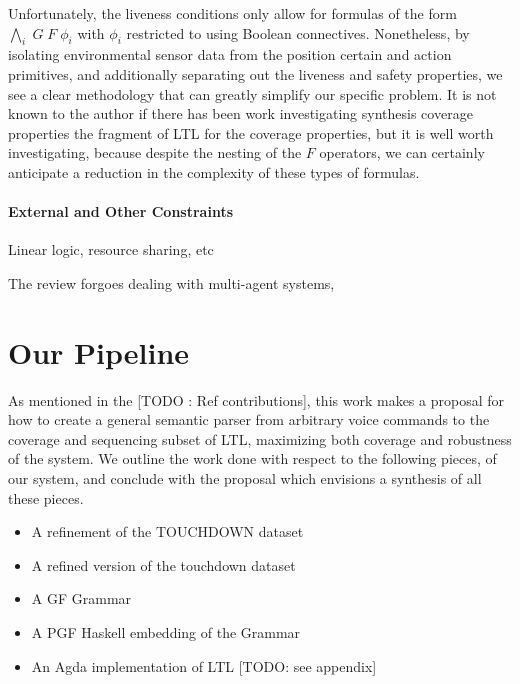 \documentclass{article}
\begin{document}
Unfortunately, the liveness conditions only allow for formulas of the form
$\underset{i}{\bigwedge}\;G\; F\; \phi_i$ with $\phi_i$ restricted to using
Boolean connectives. Nonetheless, by isolating environmental sensor data from
the position certain and action primitives, and additionally separating out the liveness
and safety properties, we see a clear methodology that can greatly simplify our
specific problem. It is not known to the author if there has been work
investigating synthesis coverage properties the fragment of LTL for the coverage
properties, but it is well worth investigating, because despite the nesting of
the $F$ operators, we can certainly anticipate a reduction in the complexity of
these types of formulas.



\paragraph{External and Other Constraints}

Linear logic, resource sharing, etc

The review \cite{synthGazit} forgoes dealing with multi-agent systems,

\section{Our Pipeline}

As mentioned in the [TODO : Ref contributions], this work makes a proposal for
how to create a general semantic parser from arbitrary voice commands to the
coverage and sequencing subset of LTL, maximizing both coverage and robustness
of the system. We outline the work done with respect to the following pieces, of
our system, and conclude with the proposal which envisions a synthesis of all
these pieces.

\begin{itemize}[noitemsep]
\item A refinement of the TOUCHDOWN dataset \cite{chen2019touchdown}
\item A refined version of the touchdown dataset
\item A GF Grammar
\item A PGF Haskell embedding of the Grammar
\item An Agda implementation of LTL [TODO: see appendix]
\end{itemize}
\end{document}

